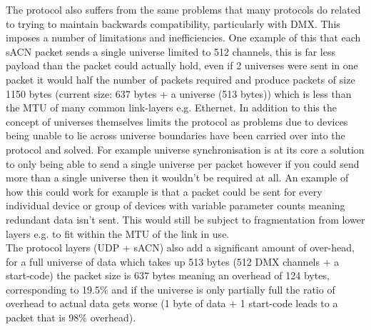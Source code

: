 \documentclass[11pt,a4paper]{article}
\begin{document}
The protocol also suffers from the same problems that many protocols do related to trying to maintain backwards compatibility, particularly with DMX. This imposes a number of limitations and inefficiencies. One example of this that each sACN packet sends a single universe limited to 512 channels, this is far less payload than the packet could actually hold, even if 2 universes were sent in one packet it would half the number of packets required and produce packets of size 1150 bytes (current size: 637 bytes + a universe (513 bytes)) which is less than the MTU of many common link-layers e.g. Ethernet. In addition to this the concept of universes themselves limits the protocol as problems due to devices being unable to lie across universe boundaries have been carried over into the protocol and solved. For example universe synchronisation is at its core a solution to only being able to send a single universe per packet however if you could send more than a single universe then it wouldn't be required at all. An example of how this could work for example is that a packet could be sent for every individual device or group of devices with variable parameter counts meaning redundant data isn't sent. This would still be subject to fragmentation from lower layers e.g. to fit within the MTU of the link in use.\\

The protocol layers (UDP + sACN) also add a significant amount of over-head, for a full universe of data which takes up 513 bytes (512 DMX channels + a start-code) the packet size is 637 bytes meaning an overhead of 124 bytes, corresponding to 19.5\% and if the universe is only partially full the ratio of overhead to actual data gets worse (1 byte of data + 1 start-code leads to a packet that is 98\% overhead).\\
\end{document}
